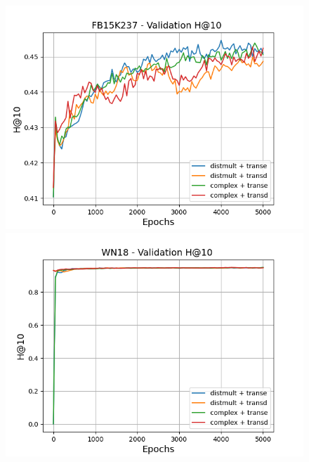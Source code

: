 \begin{figure}
    \begin{minipage}{.3\textwidth}
      \centering
      \includegraphics[width=\linewidth]{figures/results/gan_train/pretrained/random/fb15k237/gan_train_random_fb15k237_hit10s.png}
    \end{minipage}%
     \begin{minipage}{.3\textwidth}
      \centering
      \includegraphics[width=\linewidth]{figures/results/gan_train/pretrained/random/wn18/gan_train_random_wn18_hit10s.png}
    \end{minipage}%
     \begin{minipage}{.3\textwidth}
      \centering

\end{minipage}
\end{figure}
